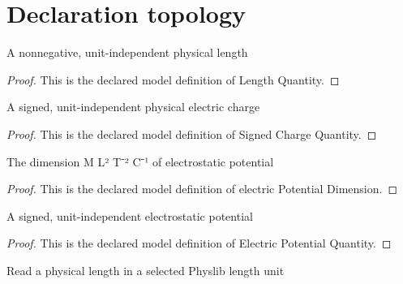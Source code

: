 \section{Declaration topology}
\begin{definition}
  \label{def:physics:phyx-mini-0860:phyxminiproblems-problemphyxmini0860-lengthquantity}
  A nonnegative, unit-independent physical length
\end{definition}
\begin{proof}
  This is the declared model definition of Length Quantity.
\end{proof}
\begin{definition}
  \label{def:physics:phyx-mini-0860:phyxminiproblems-problemphyxmini0860-signedchargequantity}
  A signed, unit-independent physical electric charge
\end{definition}
\begin{proof}
  This is the declared model definition of Signed Charge Quantity.
\end{proof}
\begin{definition}
  \label{def:physics:phyx-mini-0860:phyxminiproblems-problemphyxmini0860-electricpotentialdimension}
  The dimension M L² T⁻² C⁻¹ of electrostatic potential
\end{definition}
\begin{proof}
  This is the declared model definition of electric Potential Dimension.
\end{proof}
\begin{definition}
  \label{def:physics:phyx-mini-0860:phyxminiproblems-problemphyxmini0860-electricpotentialquantity}
  A signed, unit-independent electrostatic potential
\end{definition}
\begin{proof}
  This is the declared model definition of Electric Potential Quantity.
\end{proof}
\begin{definition}
  \label{def:physics:phyx-mini-0860:phyxminiproblems-problemphyxmini0860-lengthreadout}
  Read a physical length in a selected Physlib length unit
\end{definition}
